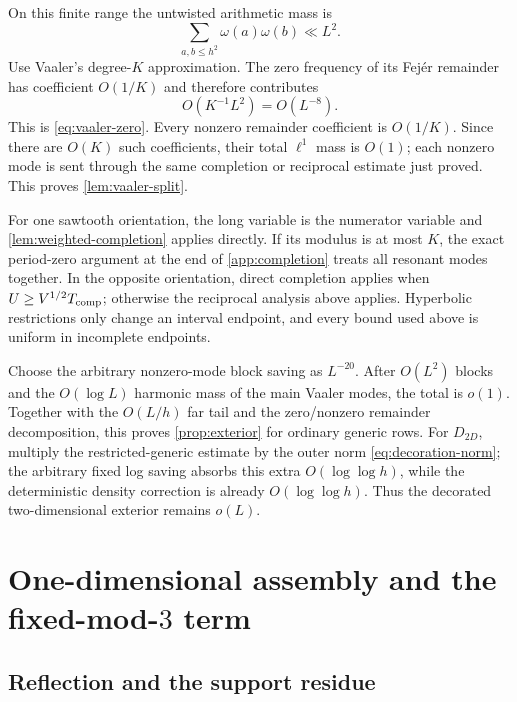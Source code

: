 \documentclass[11pt]{article}
\theoremstyle{definition}
\theoremstyle{remark}
\newcommand{\1}{\mathbf 1}
\newcommand{\om}{\omega}
\begin{document}
On this finite range the untwisted arithmetic mass is
\[
\sum_{a,b\le h^2}\om(a)\om(b)\ll L^2.
\]
Use Vaaler's degree-$K$ approximation.  The zero frequency of its Fej\'er remainder has coefficient $O(1/K)$ and therefore contributes
\[
O(K^{-1}L^2)=O(L^{-8}).
\]
This is \cref{eq:vaaler-zero}.  Every nonzero remainder coefficient is $O(1/K)$.  Since there are $O(K)$ such coefficients, their total $\ell^1$ mass is $O(1)$; each nonzero mode is sent through the same completion or reciprocal estimate just proved.  This proves \cref{lem:vaaler-split}.

For one sawtooth orientation, the long variable is the numerator variable and \cref{lem:weighted-completion} applies directly.  If its modulus is at most $K$, the exact period-zero argument at the end of \cref{app:completion} treats all resonant modes together.  In the opposite orientation, direct completion applies when
$U\ge V^{1/2}T_{\rm comp}$; otherwise the reciprocal analysis above applies.  Hyperbolic restrictions only change an interval endpoint, and every bound used above is uniform in incomplete endpoints.

Choose the arbitrary nonzero-mode block saving as $L^{-20}$.  After $O(L^2)$ blocks and the $O(\log L)$ harmonic mass of the main Vaaler modes, the total is $o(1)$.  Together with the $O(L/h)$ far tail and the zero/nonzero remainder decomposition, this proves \cref{prop:exterior} for ordinary generic rows.  For $D_{2D}$, multiply the restricted-generic estimate by the outer norm \cref{eq:decoration-norm}; the arbitrary fixed log saving absorbs this extra $O(\log\log h)$, while the deterministic density correction is already $O(\log\log h)$.  Thus the decorated two-dimensional exterior remains $o(L)$.

\section{One-dimensional assembly and the fixed-mod-\texorpdfstring{$3$}{3} term}\label{app:petermann}

\subsection{Reflection and the support residue}
\end{document}
